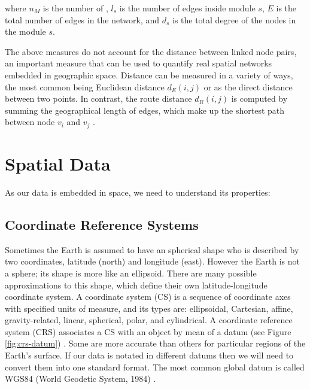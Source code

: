 where $n_M$ is the number of , $l_s$ is the number of edges inside module $s$, $E$ is the total number of edges in the network, and $d_s$ is the total degree of the nodes in the module $s$.

The above measures do not account for the distance between linked node pairs, an important measure that can be used to quantify real spatial networks embedded in geographic space. Distance can be measured in a variety of ways, the most common being Euclidean distance $d_E(i, j)$ or as the direct distance between two points. In contrast, the route distance $d_R(i, j)$ is computed by summing the geographical length of edges, which make up the shortest path between node $v_i$ and $v_j$ \cite{anderson_2020}.

\section{Spatial Data}


As our data is embedded in space, we need to understand its properties:

\subsection{Coordinate Reference Systems}

 Sometimes the Earth is assumed to have an spherical shape who is described by two coordinates, latitude (north) and longitude (east). However the Earth is not a sphere; its shape is more like an ellipsoid. There are many possible approximations to this shape, which define their own latitude-longitude coordinate system. A coordinate system (CS) is a sequence of coordinate axes with specified units of measure, and its types are: ellipsoidal, Cartesian, affine, gravity-related, linear, spherical, polar, and cylindrical. A coordinate reference system (CRS) associates a CS with an object by mean of a datum (see Figure \ref{fig:crs-datum}) \cite{nikolli_CRS_2011}. Some are more accurate than others for particular regions of the Earth's surface.  If our data is notated in different datums then we will need to convert them into one standard format. The most common global datum is called WGS84 (World Geodetic System, 1984) \cite{fox_spatial_2018}.

